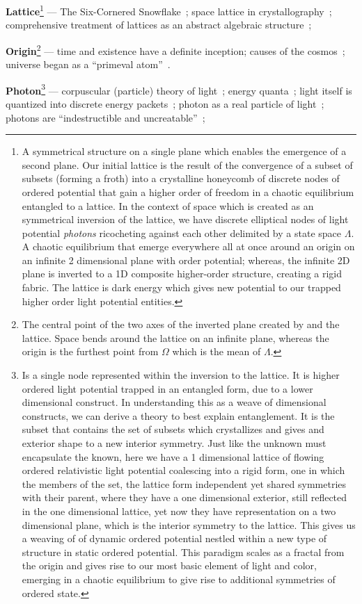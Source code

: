 \documentclass[11pt]{article}
\begin{document}
\textbf{Lattice}\label{def:lattice}\footnote{A symmetrical structure on a single plane which enables the emergence of a second plane. Our initial lattice is the result of the convergence of a subset of subsets (forming a froth) into a crystalline honeycomb of discrete nodes of ordered potential that gain a higher order of freedom in a chaotic equilibrium entangled to a lattice. In the context of space which is created as an symmetrical inversion of the lattice, we have discrete elliptical nodes of light potential \textit{photons} ricocheting against each other delimited by a state space \( \Lambda \). A chaotic equilibrium that emerge everywhere all at once around an origin on an infinite 2 dimensional plane with order potential; whereas, the infinite 2D plane is inverted to a 1D composite higher-order structure, creating a rigid fabric. The lattice is dark energy which gives new potential to our trapped higher order light potential entities.} --- The Six-Cornered Snowflake~\cite{Kepler1611}; space lattice in crystallography~\cite{Bravais1850}; comprehensive treatment of lattices as an abstract algebraic structure~\cite{Birkhoff1940};
\newpage    

\textbf{Origin}\label{def:origin}\footnote{The central point of the two axes of the inverted plane created by and the lattice. Space bends around the lattice on an infinite plane, whereas the origin is the furthest point from \( \Omega \) which is the mean of \( \Lambda \).} --- time and existence have a definite inception\cite{BibleGenesis}; causes of the cosmos~\cite{AristotleMetaphysicsLambda}; universe began as a “primeval atom”~\cite{Lemaitre1931}.
\newpage

\textbf{Photon}\label{def:photon}\footnote{Is a single node represented within the inversion to the lattice. It is higher ordered light potential trapped in an entangled form, due to a lower dimensional construct. In understanding this as a weave of dimensional constructs, we can derive a theory to best explain entanglement. It is the subset that contains the set of subsets which crystallizes and gives and exterior shape to a new interior symmetry. Just like the unknown must encapsulate the known, here we have a 1 dimensional lattice of flowing ordered relativistic light potential coalescing into a rigid form, one in which the members of the set, the lattice form independent yet shared symmetries with their parent, where they have a one dimensional exterior, still reflected in the one dimensional lattice, yet now they  have representation on a two dimensional plane, which is the interior symmetry to the lattice. This gives us a weaving of of dynamic ordered potential nestled within a new type of structure in static ordered potential. This paradigm scales as a fractal from the origin and gives rise to our most basic element of light and color, emerging in a chaotic equilibrium to give rise to additional symmetries of ordered state.} --- corpuscular (particle) theory of light~\cite{Newton1704}; energy quanta~\cite{Planck1901}; light itself is quantized into discrete energy packets~\cite{Einstein1905b};  photon as a real particle of light~\cite{Compton1923}; photons are “indestructible and uncreatable”~\cite{Lewis1926};
\newpage    
\end{document}
